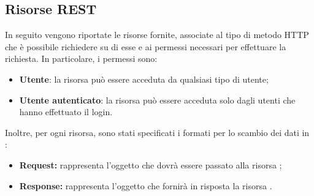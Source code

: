 \subsection{Risorse REST}
In seguito vengono riportate le risorse  fornite, associate al tipo di metodo HTTP che è possibile richiedere su di esse e ai permessi necessari per effettuare la richiesta. In particolare, i permessi sono:
\begin{itemize}
\item \textbf{Utente}: la risorsa può essere acceduta da qualsiasi tipo di utente;
\item \textbf{Utente autenticato}: la risorsa può essere acceduta solo dagli utenti che hanno effettuato il login.
\end{itemize}
Inoltre, per ogni risorsa, sono stati specificati i formati per lo scambio dei dati in :
\begin{itemize}
\item \textbf{Request:} rappresenta l'oggetto  che dovrà essere passato alla risorsa ;
\item \textbf{Response:} rappresenta l'oggetto  che fornirà in risposta la risorsa .
\end{itemize}
